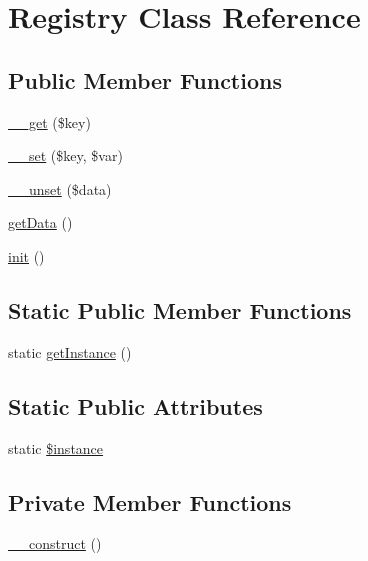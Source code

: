 \hypertarget{classRegistry}{}\section{Registry Class Reference}
\label{classRegistry}
\subsection*{Public Member Functions}
\begin{DoxyCompactItemize}
\item 
\hyperlink{classRegistry_ae0c3afb597599f8d2cdf6f434533f6a2}{\+\_\+\+\_\+get} (\$key)
\item 
\hyperlink{classRegistry_a98d0146aab268587d594e6a0dc44f27c}{\+\_\+\+\_\+set} (\$key, \$var)
\item 
\hyperlink{classRegistry_a46f5ac29f45181ee10a90d0d0292bb2b}{\+\_\+\+\_\+unset} (\$data)
\item 
\hyperlink{classRegistry_a9147d7a66bb6ab522e53162bd62302b8}{get\+Data} ()
\item 
\hyperlink{classRegistry_ac68320cf0f880d7df00c6ecd162e651b}{init} ()
\end{DoxyCompactItemize}
\subsection*{Static Public Member Functions}
\begin{DoxyCompactItemize}
\item 
static \hyperlink{classRegistry_af821839861bc43bc8a24f004be8534a7}{get\+Instance} ()
\end{DoxyCompactItemize}
\subsection*{Static Public Attributes}
\begin{DoxyCompactItemize}
\item 
static \hyperlink{classRegistry_aee4dbb24c575d446f5d91414e25fd1d1}{\$instance}
\end{DoxyCompactItemize}
\subsection*{Private Member Functions}
\begin{DoxyCompactItemize}
\item 
\hyperlink{classRegistry_a8692ca76b3f6d20e0233fdbdfa66f846}{\+\_\+\+\_\+construct} ()
\end{DoxyCompactItemize}
